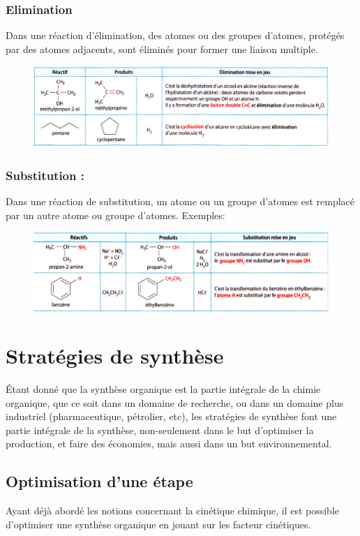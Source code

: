 \documentclass[11pt,a4paper]{article}
\begin{document}
\subsubsection*{Elimination}
Dans une réaction d’élimination, des atomes ou des groupes d’atomes, protégés par des atomes adjacents, sont éliminés pour former une liaison multiple. 
\begin{figure}[H]
    \centering
    \includegraphics[width=0.8\linewidth]{imgs/c5/elimination.jpg}
\end{figure}
\subsubsection*{Substitution : }
Dans une réaction de substitution, un atome ou un groupe d’atomes est remplacé par un autre atome ou groupe d’atomes. Exemples: 
\begin{figure}[H]
    \centering
    \includegraphics[width=0.8\linewidth]{imgs/c5/substitute.jpg}
\end{figure} 

\section{Stratégies de synthèse}
Étant donné que la synthèse organique est la partie intégrale de la chimie organique, que ce soit dans un domaine de recherche, ou dans un domaine plus industriel (pharmaceutique, pétrolier, etc), les stratégies de synthèse font une partie intégrale de la synthèse, non-seulement dans le but d'optimiser la production, et faire des économies, mais aussi dans un but environnemental. 

\subsection{Optimisation d'une étape}
Ayant déjà abordé les notions concernant la cinétique chimique, il est possible d'optimiser une synthèse organique en jouant sur les facteur cinétiques. 
\end{document}

